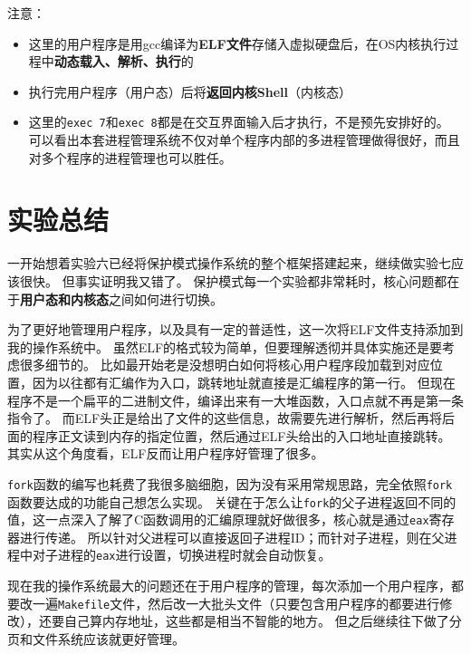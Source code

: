 \documentclass[logo,reportComp]{thesis}
\begin{document}
注意：
\begin{itemize}
	\item 这里的用户程序是用gcc编译为\textbf{ELF文件}存储入虚拟硬盘后，在OS内核执行过程中\textbf{动态载入、解析、执行}的
	\item 执行完用户程序（用户态）后将\textbf{返回内核Shell}（内核态）
	\item 这里的\verb'exec 7'和\verb'exec 8'都是在交互界面输入后才执行，不是预先安排好的。
	可以看出本套进程管理系统不仅对单个程序内部的多进程管理做得很好，而且对多个程序的进程管理也可以胜任。
\end{itemize}


\section{实验总结}
一开始想着实验六已经将保护模式操作系统的整个框架搭建起来，继续做实验七应该很快。
但事实证明我又错了。
保护模式每一个实验都非常耗时，核心问题都在于\textbf{用户态和内核态}之间如何进行切换。

为了更好地管理用户程序，以及具有一定的普适性，这一次将ELF文件支持添加到我的操作系统中。
虽然ELF的格式较为简单，但要理解透彻并具体实施还是要考虑很多细节的。
比如最开始老是没想明白如何将核心用户程序段加载到对应位置，因为以往都有汇编作为入口，跳转地址就直接是汇编程序的第一行。
但现在程序不是一个扁平的二进制文件，编译出来有一大堆函数，入口点就不再是第一条指令了。
而ELF头正是给出了文件的这些信息，故需要先进行解析，然后再将后面的程序正文读到内存的指定位置，然后通过ELF头给出的入口地址直接跳转。
其实从这个角度看，ELF反而让用户程序好管理了很多。

\verb'fork'函数的编写也耗费了我很多脑细胞，因为没有采用常规思路，完全依照\verb'fork'函数要达成的功能自己想怎么实现。
关键在于怎么让\verb'fork'的父子进程返回不同的值，这一点深入了解了C函数调用的汇编原理就好做很多，核心就是通过\verb'eax'寄存器进行传递。
所以针对父进程可以直接返回子进程ID；而针对子进程，则在父进程中对子进程的\verb'eax'进行设置，切换进程时就会自动恢复。

现在我的操作系统最大的问题还在于用户程序的管理，每次添加一个用户程序，都要改一遍\verb'Makefile'文件，然后改一大批头文件（只要包含用户程序的都要进行修改），还要自己算内存地址，这些都是相当不智能的地方。
但之后继续往下做了分页和文件系统应该就更好管理。
\end{document}
